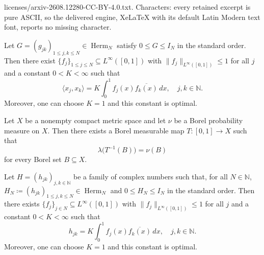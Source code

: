 \documentclass[10pt,a4paper]{amsart}
\DeclareMathOperator{\herm}{Herm}
\def\N{{\mathbb N}}
\begin{document}
licenses/arxiv-2608.12280-CC-BY-4.0.txt. Characters: every retained excerpt is pure ASCII, so the delivered engine, XeLaTeX with its default Latin Modern text font, reports no missing character.
\begin{theorem}\label{thm:main1:finite}
    Let $G=(g_{jk})_{1\le j,k\le N} \in \herm_N$ satisfy $0\leq G\leq I_N$ in the standard order. Then there exist $\{ f_j \}_{1\leq j\leq N} \subseteq L^\infty([0,1])$ with $\| f_j \|_{L^\infty([0,1])} \leq 1$ for all $j$ and a constant $0 <K< \infty$ such that
    \begin{equation}
        \langle x_j,x_k \rangle = K \int_0^1 f_j(x) \overline{f_k(x)} \, dx, \quad j,k \in \N.
    \end{equation}
    Moreover, one can choose $K=1$ and this constant is optimal.
\end{theorem}

\begin{lemma}
\label{lem:probability_realization}
Let $X$ be a nonempty compact metric space and let $\nu$ be a Borel
probability measure on $X$. Then there exists a Borel measurable map
$T:[0,1]\to X$ such that
\[
\lambda\bigl(T^{-1}(B)\bigr)=\nu(B)
\]
for every Borel set $B\subseteq X$.
\end{lemma}

\begin{theorem}\label{thm:countable_gram_realization}
    Let $H=(h_{jk})_{j,k\in \N}$ be a family of complex numbers such that, for all $N\in \N$, $H_N\coloneqq(h_{jk})_{1\leq j,k\leq N}\in \herm_N$ and $0\le H_N\le I_N$ in the standard order. Then there exists $\{ f_j \}_{j\in N} \subseteq L^\infty([0,1])$ with $\| f_j \|_{L^\infty([0,1])} \leq 1$ for all $j$ and a constant $0 <K< \infty$ such that
    \begin{equation}
        h_{jk} = K \int_0^1 f_j(x) \overline{f_k(x)} \, dx, \quad j,k \in \N.
    \end{equation}
    Moreover, one can choose $K=1$ and this constant is optimal.
\end{theorem}
\end{document}
